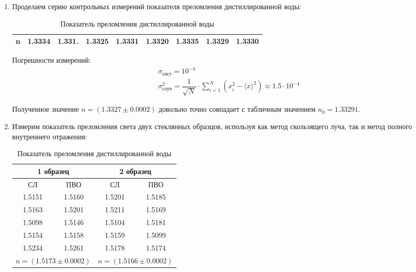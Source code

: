 \documentclass{lab}
\begin{document}
\begin{enumerate}
\item
Проделаем серию контрольных измерений показателя преломления дистиллированной воды:
\begin{table}[H]
	\centering
	\begin{tabular}{|c|cccccccc|}
		\hline
		n &1.3334 &1.331. &1.3325 &1.3331 &1.3320 &1.3335 &1.3329 &1.3330 \\\hline
	\end{tabular}
	\caption{Показатель преломления дистиллированной воды}
	\label{tab_1}
\end{table}

Погрешности измерений:
\begin{equation}
\begin{aligned}
&\sigma_{сист} = 10^{-4}\\
&\sigma_{случ}^2 = \dfrac{1}{\sqrt{N}} \cdot \sum_{i = 1}^{N} \left( x_i^2 - \langle x \rangle^2 \right) \approx 1.5 \cdot 10^{-4}
\end{aligned}
\end{equation}

Полученное значение $ n = (1.3327 \pm 0.0002) $ довольно точно совпадает с табличным значением $ n_0 = 1.33291 $.

\item
Измерим показатель преломления света двух стеклянных образцов, используя как метод скользящего луча, так и метод полного внутреннего отражения:
\begin{table}[H]
	\centering
	\begin{tabular}{|cc|cc|}
		\hline
		\multicolumn{2}{|c|}{1 образец} & \multicolumn{2}{c|}{2 образец} \\ \hline
		СЛ & ПВО & СЛ & ПВО \\
		1.5151 & 1.5160 & 1.5201 & 1.5185 \\
		1.5163 & 1.5201 & 1.5211 & 1.5169 \\
		1.5098 & 1.5146 & 1.5104 & 1.5181 \\
		1.5154 & 1.5158 & 1.5159 & 1.5099 \\
		1.5234 & 1.5261 & 1.5178 & 1.5174 \\ \hline
		\multicolumn{2}{|c|}{$ n = (1.5173 \pm 0.0002) $} & \multicolumn{2}{c|}{$ n = (1.5166 \pm 0.0002) $} \\ \hline
	\end{tabular}
	\caption{Показатель преломления дистиллированной воды}
	\label{tab_2}
\end{table}


\end{enumerate}
\end{document}
